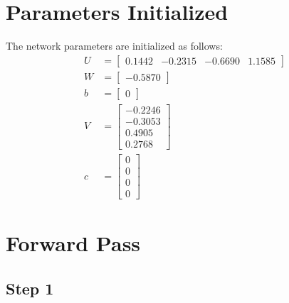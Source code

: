 \documentclass{article}
\begin{document}
\section{Parameters Initialized}
The network parameters are initialized as follows:
\begin{align*}
U &= \begin{bmatrix}
    0.1442 & -0.2315 & -0.6690 & 1.1585
\end{bmatrix} \\
W &= \begin{bmatrix}
    -0.5870
\end{bmatrix}\\
b &= \begin{bmatrix}
    0
\end{bmatrix}\\
V &= \begin{bmatrix}
    -0.2246 \\
    -0.3053 \\
    0.4905 \\
    0.2768
\end{bmatrix}\\
c &= \begin{bmatrix}
    0 \\
    0 \\
    0 \\
    0
\end{bmatrix}
\end{align*}
\newpage
\section{Forward Pass}
\subsection{Step 1}
\end{document}
